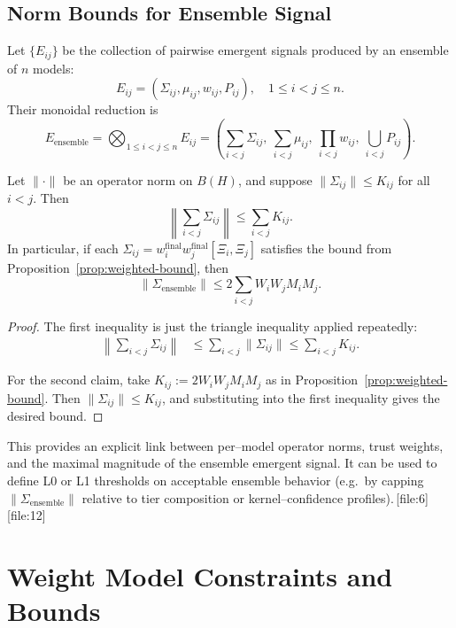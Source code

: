 \documentclass[11pt]{article}
\begin{document}
\subsection{Norm Bounds for Ensemble Signal}

Let \(\{E_{ij}\}\) be the collection of pairwise emergent signals produced by
an ensemble of \(n\) models:
\[
  E_{ij} = (\Sigma_{ij},\mu_{ij},w_{ij},P_{ij}), \quad 1 \le i < j \le n.
\]
Their monoidal reduction is
\[
  E_{\mathrm{ensemble}} =
  \bigotimes_{1 \le i < j \le n} E_{ij}
  = \left(
      \sum_{i<j} \Sigma_{ij},\
      \sum_{i<j} \mu_{ij},\
      \prod_{i<j} w_{ij},\
      \bigcup_{i<j} P_{ij}
    \right).
\]

\begin{proposition}
\label{prop:ensemble-bound}
Let \(\|\cdot\|\) be an operator norm on \(B(H)\), and suppose
\(\|\Sigma_{ij}\| \le K_{ij}\) for all \(i<j\). Then
\[
  \left\|\sum_{i<j} \Sigma_{ij}\right\|
  \le \sum_{i<j} K_{ij}.
\]
In particular, if each \(\Sigma_{ij} = w_i^{\mathrm{final}} w_j^{\mathrm{final}} [\Xi_i,\Xi_j]\)
satisfies the bound from Proposition~\ref{prop:weighted-bound}, then
\[
  \bigl\|\Sigma_{\mathrm{ensemble}}\bigr\|
  \le 2\sum_{i<j} W_i W_j M_i M_j.
\]
\end{proposition}

\begin{proof}
The first inequality is just the triangle inequality applied repeatedly:
\begin{align*}
  \left\|\sum_{i<j} \Sigma_{ij}\right\|
  &\le \sum_{i<j} \|\Sigma_{ij}\|
  \le \sum_{i<j} K_{ij}.
\end{align*}

For the second claim, take
\(K_{ij} := 2 W_i W_j M_i M_j\) as in
Proposition~\ref{prop:weighted-bound}. Then
\(\|\Sigma_{ij}\| \le K_{ij}\), and substituting into the first inequality
gives the desired bound.
\end{proof}

This provides an explicit link between per--model operator norms, trust
weights, and the maximal magnitude of the ensemble emergent signal. It can be
used to define L0 or L1 thresholds on acceptable ensemble behavior (e.g.\ by
capping \(\bigl\|\Sigma_{\mathrm{ensemble}}\bigr\|\) relative to tier
composition or kernel--confidence profiles).\,[file:6][file:12]

\section{Weight Model Constraints and Bounds}
\end{document}

